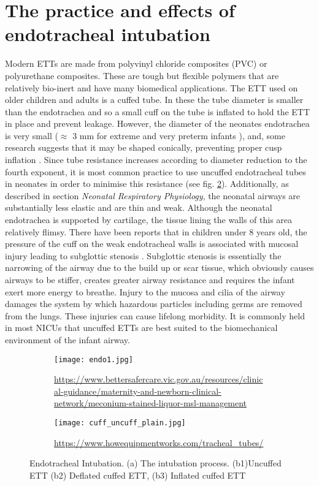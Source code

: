 \documentclass[12pt, openany, oneside]{book}
\begin{document}
\section{The practice and effects of endotracheal intubation}
Modern ETTs are made from polyvinyl chloride composites (PVC) or polyurethane composites. These are tough but flexible polymers that are relatively bio-inert and have many biomedical applications. The ETT used on older children and adults is a cuffed tube. In these the tube diameter is smaller than the endotrachea and so a small cuff on the tube is inflated to hold the ETT in place and prevent leakage. However, the diameter of the neonates endotrachea is very small ($\approx$ 3 mm for extreme and very preterm infants \citep{ett}), and, some research suggests that it may be shaped conically, preventing proper cusp inflation \citep{strong1977endotracheal}. Since tube resistance increases according to diameter reduction to the fourth exponent, it is most common practice to use uncuffed endotracheal tubes in neonates in order to minimise this resistance (see fig. \ref{fig:endo2}). Additionally, as described in section \textit{Neonatal Respiratory Physiology}, the neonatal airways are substantially less elastic and are thin and weak. Although the neonatal endotrachea is supported by cartilage, the tissue lining the walls of this area relatively flimsy. There have been reports that in children under 8 years old, the pressure of the cuff on the weak endotracheal walls is associated with mucosal injury leading to subglottic stenosis \citep{thomas2016cuffed}. Subglottic stenosis is essentially the narrowing of the airway due to the build up or scar tissue, which obviously causes airways to be stiffer, creates greater airway resistance and requires the infant exert more energy to breathe. Injury to the mucosa and cilia of the airway damages the system by which hazardous particles including germs are removed from the lungs. These injuries can cause lifelong morbidity. It is commonly held in most NICUs that uncuffed ETTs are best suited to the biomechanical environment of the infant airway.\\

\begin{figure}
\centering
	\begin{subfigure}{0.4\textwidth}
		\texttt{[image: endo1.jpg]}
		\caption{\tiny{\url{https://www.bettersafercare.vic.gov.au/resources/clinical-guidance/maternity-and-newborn-clinical-network/meconium-stained-liquor-msl-management}}}
		\label{fig:endo1}
		
	\end{subfigure}%
	\hfill
	\begin{subfigure}{0.5\textwidth}
		\texttt{[image: cuff\_uncuff\_plain.jpg]}
		\caption{{\tiny\url{https://www.howequipmentworks.com/tracheal_tubes/}}}
		\label{fig:endo2}
	\end{subfigure}
	
	\caption[Endotracheal Intubation]{Endotracheal Intubation. (a) The intubation process. (b1)Uncuffed ETT (b2) Deflated cuffed ETT, (b3) Inflated cuffed ETT}
	\label{fig:endo}
\end{figure}
\end{document}
